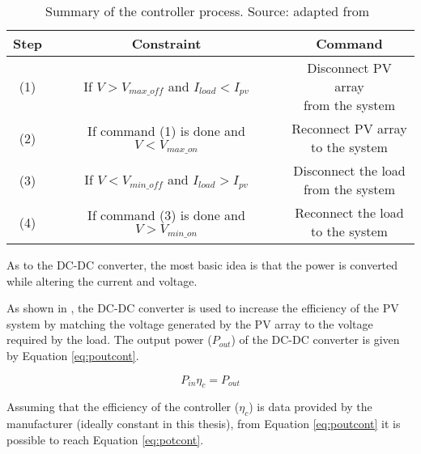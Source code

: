 \begin{table}[!t]
\renewcommand{\arraystretch}{1.3}
\caption{Summary of the controller process. Source: adapted from~\cite{Hansen}}
\label{table:controller}
\centering
\begin{tabular}{c | c | c }
\hline
\hline
Step  & Constraint & Command\\
\hline
\hline
(1) & \makecell{If $V > V_{max \_ off}$ \\and $I_{load} < I_{pv}$} & \makecell{Disconnect PV array \\from the system}\\
\hline
(2) & \makecell{If command (1) is \\done and $V < V_{max \_ on}$} & \makecell{Reconnect PV array \\to the system}\\
\hline
(3) & \makecell{If $V < V_{min \_ off}$ and \\ $I_{load} > I_{pv}$} & \makecell{Disconnect the load \\from the system}\\
\hline
(4) & \makecell{If command (3) is \\ done and $V > V_{min \_ on}$} & \makecell{Reconnect the load \\to the system}\\
\hline
\hline
\end{tabular}
\end{table}

As to the DC-DC converter, the most basic idea is that the power is converted while altering the current and voltage. 

As shown in \cite{Abdulateef}, the DC-DC converter is used to increase the efficiency of the PV system by matching the voltage generated by the PV array to the voltage required by the load. The output power ($ P_{out} $) of the DC-DC converter is given by Equation \ref{eq:poutcont}. 

\begin{equation}
\label{eq:poutcont}
P_{in} \eta_{c} = P_{out}
\end{equation}

Assuming that the efficiency of the controller ($ \eta_{c} $) is data provided by the manufacturer (ideally constant in this thesis), from Equation \ref{eq:poutcont} it is possible to reach Equation \ref{eq:potcont}.

